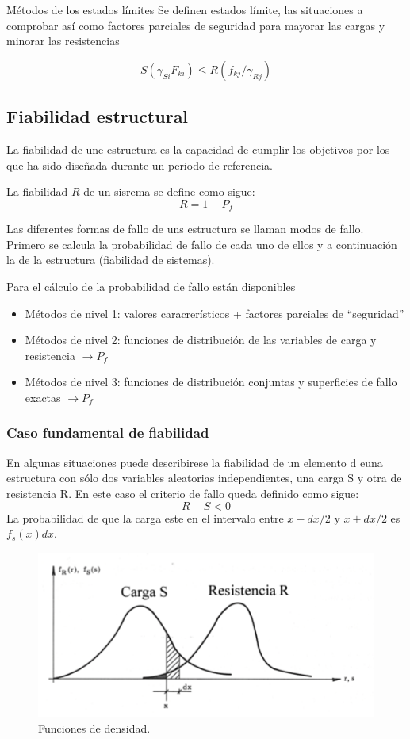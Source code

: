 Métodos de los estados límites
Se definen estados límite, las situaciones a comprobar así como factores parciales de seguridad para mayorar las cargas y minorar las resistencias

\[ S(\gamma_{Si} F_{ki}) \leq R(f_{kj}/ \gamma_ {Rj}) \]

\subsection{Fiabilidad estructural}
La fiabilidad de une estructura es la capacidad de cumplir los objetivos por los que ha sido diseñada durante un periodo de referencia.

La fiabilidad $R$ de un sisrema se define como sigue:
\[R = 1 - P_f\]

Las diferentes formas de fallo de uns estructura se llaman modos de fallo. Primero se calcula la probabilidad de fallo de cada uno de ellos y a continuación la de la estructura (fiabilidad de sistemas).

Para el cálculo de la probabilidad de fallo están disponibles
\begin{itemize}
    \item Métodos de nivel 1: valores caracrerísticos + factores parciales de ``seguridad'' %
    \item Métodos de nivel 2: funciones de distribución de las variables de carga y resistencia $ \rightarrow P_f$
    \item Métodos de nivel 3: funciones de distribución conjuntas y superficies de fallo exactas $\rightarrow P_f$
\end{itemize}

\subsubsection{Caso fundamental de fiabilidad}
En algunas situaciones puede describirese la fiabilidad de un elemento d euna estructura con sólo dos variables aleatorias independientes, una carga S y otra de resistencia R. En este caso el criterio de fallo queda definido como sigue:
\[R - S < 0\]
La probabilidad de que la carga este en el intervalo entre $x - dx/2$ y $x + dx/2$ es $f_s(x)dx$.


\begin{figure}[h]
    \centering
    \includegraphics[width = 0.5 \textwidth]{Imagenes/Fiabilidad estructural - Funciones de densidad.png}
    \caption{Funciones de densidad.}
\end{figure}

